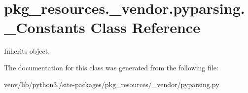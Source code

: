 \hypertarget{classpkg__resources_1_1__vendor_1_1pyparsing_1_1___constants}{}\section{pkg\+\_\+resources.\+\_\+vendor.\+pyparsing.\+\_\+\+Constants Class Reference}
\label{classpkg__resources_1_1__vendor_1_1pyparsing_1_1___constants}


Inherits object.



The documentation for this class was generated from the following file\+:\begin{DoxyCompactItemize}
\item 
venv/lib/python3./site-\/packages/pkg\+\_\+resources/\+\_\+vendor/pyparsing.\+py\end{DoxyCompactItemize}
